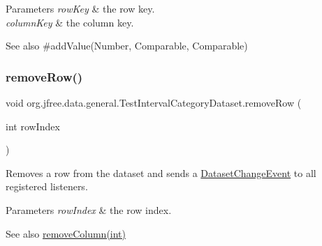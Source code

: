 \begin{DoxyParams}{Parameters}
{\em row\+Key} & the row key. \\
\hline
{\em column\+Key} & the column key.\\
\hline
\end{DoxyParams}
\begin{DoxySeeAlso}{See also}
\#add\+Value(\+Number, Comparable, Comparable) 
\end{DoxySeeAlso}
\mbox{\label{classorg_1_1jfree_1_1data_1_1general_1_1_test_interval_category_dataset_a403f2f5d4fd89770e090526150d10e5a}} 
\subsubsection{\texorpdfstring{remove\+Row()}{removeRow()}\hspace{0.1cm}{\footnotesize\ttfamily [1/2]}}
{\footnotesize\ttfamily void org.\+jfree.\+data.\+general.\+Test\+Interval\+Category\+Dataset.\+remove\+Row (\begin{DoxyParamCaption}\item[{int}]{row\+Index }\end{DoxyParamCaption})}

Removes a row from the dataset and sends a \mbox{\hyperlink{classorg_1_1jfree_1_1data_1_1general_1_1_dataset_change_event}{Dataset\+Change\+Event}} to all registered listeners.


\begin{DoxyParams}{Parameters}
{\em row\+Index} & the row index.\\
\hline
\end{DoxyParams}
\begin{DoxySeeAlso}{See also}
\mbox{\hyperlink{classorg_1_1jfree_1_1data_1_1general_1_1_test_interval_category_dataset_af614310dfa6e029f6d910793b7e9e3b4}{remove\+Column(int)}} 
\end{DoxySeeAlso}
\mbox{\label{classorg_1_1jfree_1_1data_1_1general_1_1_test_interval_category_dataset_a81dd569d6fc2b5520b35012a5bb392f6}} 
